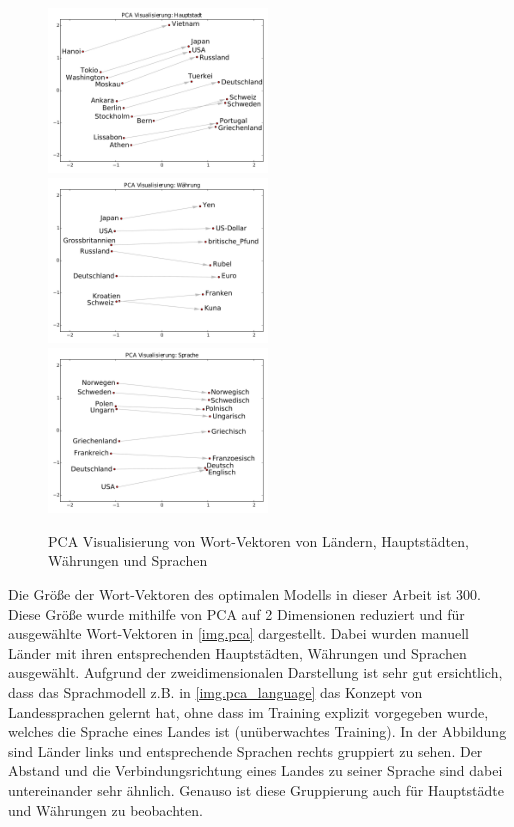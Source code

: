 \begin{figure}[!ht]
\begin{adjustwidth}{-4mm}{-4mm}
\centering
{}
{\includegraphics[width=0.52\textwidth]{images/pca_capital}}
{\includegraphics[width=0.52\textwidth]{images/pca_currency}}
{\includegraphics[width=0.52\textwidth]{images/pca_language}}
\caption[PCA Visualisierung von Wort-Vektoren]{PCA Visualisierung von Wort-Vektoren von Ländern, Hauptstädten, Währungen und Sprachen}\label{img.pca}
\end{adjustwidth}
\end{figure}

Die Größe der Wort-Vektoren des optimalen Modells in dieser Arbeit ist 300. Diese Größe wurde mithilfe von PCA auf 2 Dimensionen reduziert und für ausgewählte Wort-Vektoren in \autoref{img.pca} dargestellt. Dabei wurden manuell Länder mit ihren entsprechenden Hauptstädten, Währungen und Sprachen ausgewählt. Aufgrund der zweidimensionalen Darstellung ist sehr gut ersichtlich, dass das Sprachmodell z.B. in \autoref{img.pca_language} das Konzept von Landessprachen gelernt hat, ohne dass im Training explizit vorgegeben wurde, welches die Sprache eines Landes ist (unüberwachtes Training). In der Abbildung sind Länder links und entsprechende Sprachen rechts gruppiert zu sehen. Der Abstand und die Verbindungsrichtung eines Landes zu seiner Sprache sind dabei untereinander sehr ähnlich. Genauso ist diese Gruppierung auch für Hauptstädte und Währungen zu beobachten.

